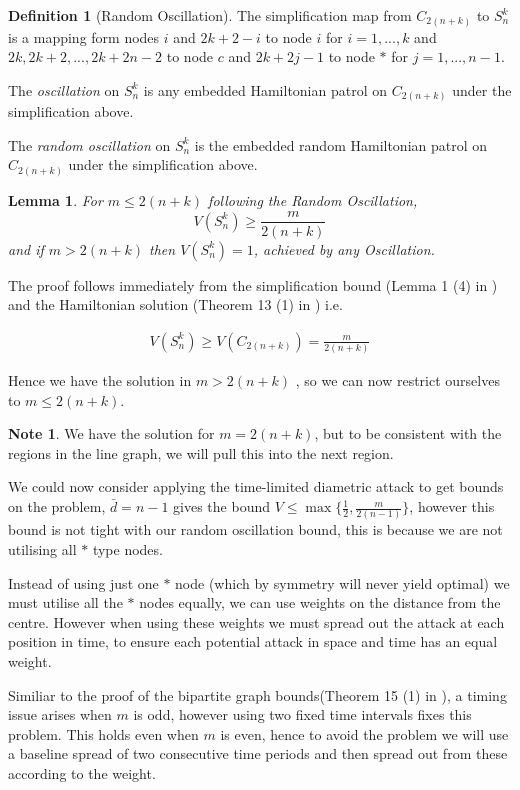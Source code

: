 \documentclass[a4paper,10pt]{article}
\newtheorem{lemma}[theorem]{Lemma}
\theoremstyle{definition}
\newtheorem{definition}[theorem]{Definition}
\theoremstyle{definition}
\theoremstyle{remark}
\theoremstyle{definition}
\newtheorem*{note}{Note}
\begin{document}
\begin{definition}[Random Oscillation]
The simplification map from $C_{2(n+k)}$ to $S_{n}^{k}$ is a mapping form nodes $i$ and $2k+2-i$ to node $i$ for $i=1,...,k$ and $2k,2k+2,...,2k+2n-2$ to node $c$ and $2k+2j-1$ to node $*$ for $j=1,...,n-1$.

The \textit{oscillation} on $S_{n}^{k}$ is any embedded Hamiltonian patrol on $C_{2(n+k)}$ under the simplification above.

The \textit{random oscillation} on $S_{n}^{k}$ is the embedded random Hamiltonian patrol on $C_{2(n+k)}$ under the simplification above.
\end{definition}

\begin{lemma}
For $m \leq 2(n+k)$ following the Random Oscillation,
$$V(S_{n}^{k}) \geq \frac{m}{2(n+k)}$$
and if $m > 2(n+k)$ then $V(S_{n}^{k})=1$, achieved by any Oscillation.
\end{lemma}

The proof follows immediately from the simplification bound (Lemma 1 (4) in \cite{Alpern2011}) and the Hamiltonian solution (Theorem 13 (1) in \cite{Alpern2011}) i.e.

\begin{align*}
V(S_{n}^{k}) \geq V(C_{2(n+k)})=\frac{m}{2(n+k)}
\end{align*}

Hence we have the solution in $m > 2(n+k)$ , so we can now restrict ourselves to $m \leq 2(n+k)$.


\begin{note}
We have the solution for $m=2(n+k)$, but to be consistent with the regions in the line graph, we will pull this into the next region.
\end{note}

We could now consider applying the time-limited diametric attack to get bounds on the problem, $\bar{d}=n-1$ gives the bound $V \leq \max \{\frac{1}{2} , \frac{m}{2(n-1)}  \}$, however this bound is not tight with our random oscillation bound, this is because we are not utilising all $*$ type nodes.

Instead of using just one $*$ node (which by symmetry will never yield optimal) we must utilise all the $*$ nodes equally, we can use weights on the distance from the centre. However when using these weights we must spread out  the attack at each position in time, to ensure each potential attack in space and time has an equal weight.

Similiar to the proof of the bipartite graph bounds(Theorem 15 (1) in \cite{Alpern2011}), a timing issue arises when $m$ is odd, however using two fixed time intervals fixes this problem. This holds even when $m$ is even, hence to avoid the problem we will use a baseline spread of two consecutive time periods and then spread out from these according to the weight.
\end{document}
